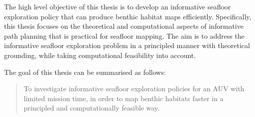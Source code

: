 	The high level objective of this thesis is to develop an informative seafloor exploration policy that can produce benthic habitat maps efficiently. Specifically, this thesis focuses on the theoretical and computational aspects of informative path planning that is practical for seafloor mapping. The aim is to address the informative seafloor exploration problem in a principled manner with theoretical grounding, while taking computational feasibility into account. 
	
	The goal of this thesis can be summarised as follows:
	
	\begin{quote}
		To investigate informative seafloor exploration policies for an AUV with limited mission time, in order to map benthic habitats faster in a principled and computationally feasible way.
	\end{quote}
%	
%		
%		
%		
%		
